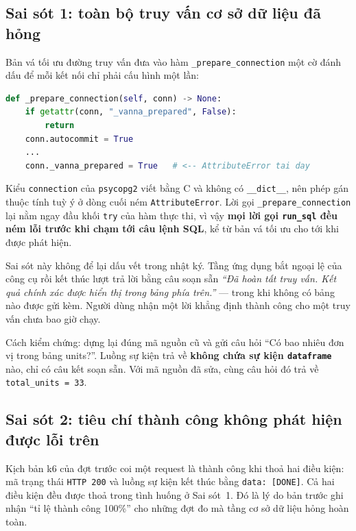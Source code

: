 \documentclass[12pt,a4paper]{article}
\begin{document}
\subsection{Sai sót 1: toàn bộ truy vấn cơ sở dữ liệu đã hỏng}

Bản vá tối ưu đường truy vấn đưa vào hàm \texttt{\_prepare\_connection} một cờ
đánh dấu để mỗi kết nối chỉ phải cấu hình một lần:

\begin{lstlisting}[language=Python]
def _prepare_connection(self, conn) -> None:
    if getattr(conn, "_vanna_prepared", False):
        return
    conn.autocommit = True
    ...
    conn._vanna_prepared = True   # <-- AttributeError tai day
\end{lstlisting}

\noindent Kiểu \texttt{connection} của \texttt{psycopg2} viết bằng C và không có
\texttt{\_\_dict\_\_}, nên phép gán thuộc tính tuỳ ý ở dòng cuối ném
\texttt{AttributeError}. Lời gọi \texttt{\_prepare\_connection} lại nằm ngay đầu
khối \texttt{try} của hàm thực thi, vì vậy \textbf{mọi lời gọi \texttt{run\_sql}
đều ném lỗi trước khi chạm tới câu lệnh SQL}, kể từ bản vá tối ưu cho tới khi
được phát hiện.

Sai sót này không để lại dấu vết trong nhật ký. Tầng ứng dụng bắt ngoại lệ của
công cụ rồi kết thúc lượt trả lời bằng câu soạn sẵn \emph{``Đã hoàn tất truy vấn.
Kết quả chính xác được hiển thị trong bảng phía trên.''} --- trong khi không có
bảng nào được gửi kèm. Người dùng nhận một lời khẳng định thành công cho một truy
vấn chưa bao giờ chạy.

Cách kiểm chứng: dựng lại đúng mã nguồn cũ và gửi câu hỏi ``Có bao nhiêu đơn vị
trong bảng units?''. Luồng sự kiện trả về \textbf{không chứa sự kiện
\texttt{dataframe}} nào, chỉ có câu kết soạn sẵn. Với mã nguồn đã sửa, cùng câu
hỏi đó trả về \texttt{total\_units = 33}.

\subsection{Sai sót 2: tiêu chí thành công không phát hiện được lỗi trên}

Kịch bản k6 của đợt trước coi một request là thành công khi thoả hai điều kiện:
mã trạng thái \texttt{HTTP 200} và luồng sự kiện kết thúc bằng \texttt{data:
[DONE]}. Cả hai điều kiện đều được thoả trong tình huống ở Sai sót~1. Đó là lý do
bản trước ghi nhận ``tỉ lệ thành công 100\%'' cho những đợt đo mà tầng cơ sở dữ
liệu hỏng hoàn toàn.
\end{document}
